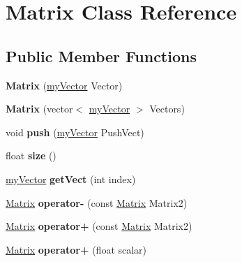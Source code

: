 \hypertarget{class_matrix}{}\section{Matrix Class Reference}
\label{class_matrix}
\subsection*{Public Member Functions}
\begin{DoxyCompactItemize}
\item 
\hypertarget{class_matrix_a160cff6ce1e97667a65a38bf2b27bee7}{}{\bfseries Matrix} (\hyperlink{classmy_vector}{my\+Vector} Vector)\label{class_matrix_a160cff6ce1e97667a65a38bf2b27bee7}

\item 
\hypertarget{class_matrix_ad5c650c4d756150eba07f6349b71a5ba}{}{\bfseries Matrix} (vector$<$ \hyperlink{classmy_vector}{my\+Vector} $>$ Vectors)\label{class_matrix_ad5c650c4d756150eba07f6349b71a5ba}

\item 
\hypertarget{class_matrix_a467d93f6b7c6fcf2a262e5fbe7fe0510}{}void {\bfseries push} (\hyperlink{classmy_vector}{my\+Vector} Push\+Vect)\label{class_matrix_a467d93f6b7c6fcf2a262e5fbe7fe0510}

\item 
\hypertarget{class_matrix_a424bd611feb6a7c042565e46f67c4179}{}float {\bfseries size} ()\label{class_matrix_a424bd611feb6a7c042565e46f67c4179}

\item 
\hypertarget{class_matrix_ae9255a7cc1b870416b1e8ef1a238e5fb}{}\hyperlink{classmy_vector}{my\+Vector} {\bfseries get\+Vect} (int index)\label{class_matrix_ae9255a7cc1b870416b1e8ef1a238e5fb}

\item 
\hypertarget{class_matrix_a3be746991daa9fd0d8801867172cb4a2}{}\hyperlink{class_matrix}{Matrix} {\bfseries operator-\/} (const \hyperlink{class_matrix}{Matrix} Matrix2)\label{class_matrix_a3be746991daa9fd0d8801867172cb4a2}

\item 
\hypertarget{class_matrix_a6fb02752ca02be25507f9797d67ce0cb}{}\hyperlink{class_matrix}{Matrix} {\bfseries operator+} (const \hyperlink{class_matrix}{Matrix} Matrix2)\label{class_matrix_a6fb02752ca02be25507f9797d67ce0cb}

\item 
\hypertarget{class_matrix_a8fbc259eb3613665b0bf0c65c9aa0f48}{}\hyperlink{class_matrix}{Matrix} {\bfseries operator+} (float scalar)\label{class_matrix_a8fbc259eb3613665b0bf0c65c9aa0f48}


\end{DoxyCompactItemize}

